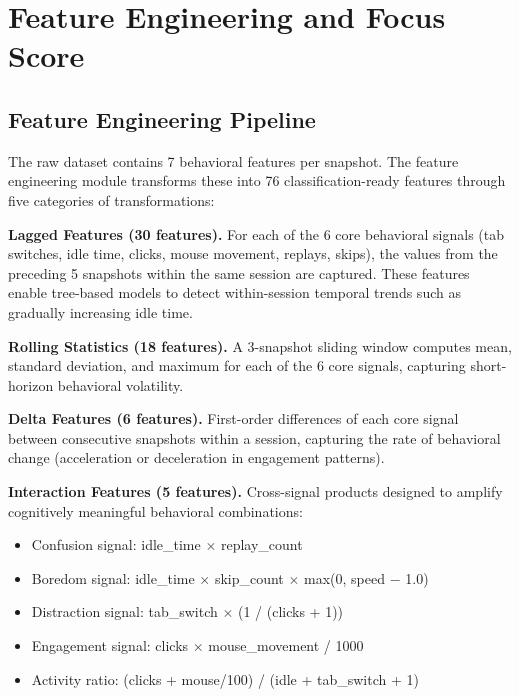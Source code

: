 \documentclass[conference]{IEEEtran}
\begin{document}
\section{Feature Engineering and Focus Score}

\subsection{Feature Engineering Pipeline}

The raw dataset contains 7 behavioral features per snapshot. The feature engineering module transforms these into 76 classification-ready features through five categories of transformations:

\textbf{Lagged Features (30 features).} For each of the 6 core behavioral signals (tab switches, idle time, clicks, mouse movement, replays, skips), the values from the preceding 5 snapshots within the same session are captured. These features enable tree-based models to detect within-session temporal trends such as gradually increasing idle time.

\textbf{Rolling Statistics (18 features).} A 3-snapshot sliding window computes mean, standard deviation, and maximum for each of the 6 core signals, capturing short-horizon behavioral volatility.

\textbf{Delta Features (6 features).} First-order differences of each core signal between consecutive snapshots within a session, capturing the rate of behavioral change (acceleration or deceleration in engagement patterns).

\textbf{Interaction Features (5 features).} Cross-signal products designed to amplify cognitively meaningful behavioral combinations:
\begin{itemize}[leftmargin=*]
    \item Confusion signal: idle\_time $\times$ replay\_count
    \item Boredom signal: idle\_time $\times$ skip\_count $\times$ max(0, speed $-$ 1.0)
    \item Distraction signal: tab\_switch $\times$ (1 / (clicks + 1))
    \item Engagement signal: clicks $\times$ mouse\_movement / 1000
    \item Activity ratio: (clicks + mouse/100) / (idle + tab\_switch + 1)
\end{itemize}
\end{document}
